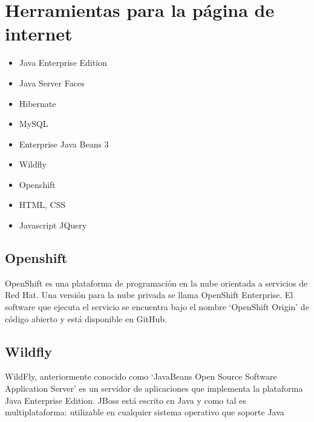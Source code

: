 \chapter{Herramientas para la página de internet}\label{chap:webTools}

\begin{itemize}
	\item Java Enterprise Edition
	\item Java Server Faces
	\item Hibernate
	\item MySQL
	\item Enterprise Java Beans 3
	\item Wildfly
	\item Openshift
	\item HTML, CSS
	\item Javascript JQuery
\end{itemize}


\section{Openshift}
		OpenShift es una plataforma de programación en la nube orientada a servicios de Red Hat. Una versión para la nube privada se llama OpenShift Enterprise. El software que ejecuta el servicio se encuentra bajo el nombre `OpenShift Origin' de código abierto y está disponible en GitHub.

\section{Wildfly}
	WildFly, anteriormente conocido como `JavaBeans Open Source Software Application Server' es un servidor de aplicaciones que implementa la plataforma Java Enterprise Edition. JBoss está escrito en Java y como tal es multiplataforma: utilizable en cualquier sistema operativo que soporte Java